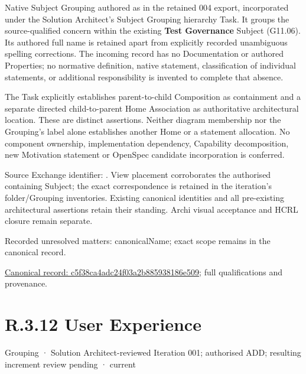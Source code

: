 Native Subject Grouping authored as \texttt{} in the retained 004 export,
incorporated under the Solution Architect's Subject Grouping hierarchy Task.
It groups the source-qualified \texttt{} concern within
the existing \textbf{Test Governance} Subject (G11.06). Its authored full name
is retained apart from explicitly recorded unambiguous spelling corrections.
The incoming record has no Documentation or authored Properties; no normative
definition, native statement, classification of individual statements, or
additional responsibility is invented to complete that absence.



The Task explicitly establishes parent-to-child Composition as containment and
a separate directed child-to-parent Home Association as authoritative architectural
location. These are distinct assertions. Neither diagram membership nor the
Grouping's label alone establishes another Home or a statement allocation.
No component ownership, implementation dependency, Capability decomposition,
new Motivation statement or OpenSpec candidate incorporation is conferred.



Source Exchange identifier: \texttt{}. View placement corroborates
the authorised containing Subject; the exact correspondence is retained in the
iteration's folder/Grouping inventories. Existing canonical identities and all
pre-existing architectural assertions retain their standing. Archi visual
acceptance and HCRL closure remain separate.


{\small Recorded unresolved matters: canonicalName; exact scope remains in the canonical record.}\par
{\footnotesize \href{../../../../continuum/grouping/c5f38ca4adc24f03a2b885938186e509.md}{Canonical record: c5f38ca4adc24f03a2b885938186e509}; full qualifications and provenance.}\par
\section*{R.3.12 User Experience}
\label{navigation:R.3.12}

\label{element:1c57a3d9080443178f6e9159d0591c77}
{\small Grouping · Solution Architect-reviewed Iteration 001; authorised ADD; resulting increment review pending · current}\par

